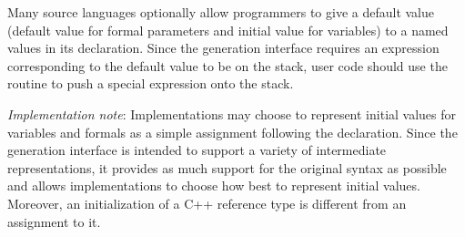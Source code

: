 
Many source languages optionally allow programmers to give a default
value (default value for formal parameters and initial value for
variables) to a named values in its declaration.  Since the generation
interface requires an expression corresponding to the default value to
be on the stack, user code should use the 
routine to push a special expression onto the stack.

\emph{Implementation note}: Implementations may choose to represent
initial values for variables and formals as a simple assignment
following the declaration.  Since the generation interface is intended 
to support a variety of intermediate representations, it provides as
much support for the original syntax as possible and allows
implementations to choose how best to represent initial values.
Moreover, an initialization of a C++ reference type is different from
an assignment to it.

